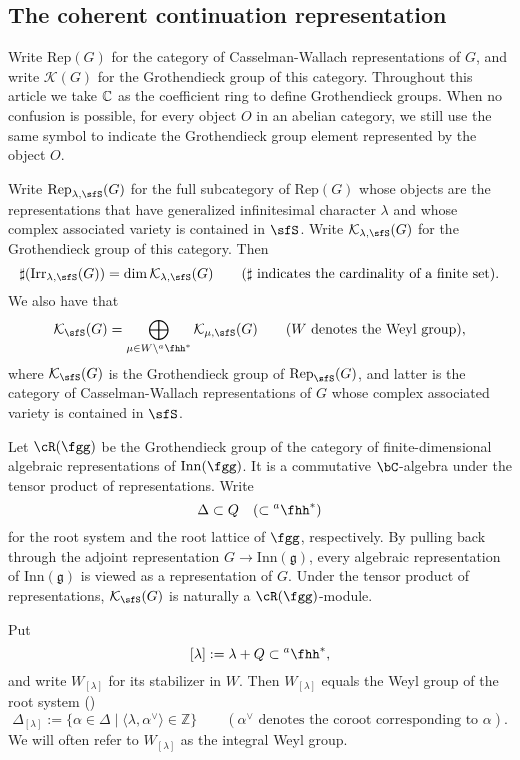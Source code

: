 \documentclass[12pt,a4paper]{amsart}
\newcommand{\CK}{{\mathcal {K}}}
\newcommand{\g}{\mathfrak g}
\newcommand{\Z}{\mathbb{Z}}
\numberwithin{equation}{section}
\theoremstyle{remark}
\def\Irr{\mathrm{Irr}}
\def\hha{{}^a\fhh}
\newcommand{\Lam}{{[\lambda]}}
\newcommand{\Rg}{\cR(\fgg)}
\begin{document}
\subsection{The coherent continuation representation}\label{sec11}


Write $\mathrm{Rep}(G)$ for the category of Casselman-Wallach representations of $G$, and write $\CK(G)$ for the
Grothendieck group of this category.  Throughout this article we take $\mathbb{C}$ as the coefficient ring to define  Grothendieck groups.
When no confusion is possible, for every object $O$ in an abelian category, we  still use the same symbol to indicate the Grothendieck group element represented by the object $O$.


Write $\mathrm{Rep}_{\lambda, \sfS}(G)$ for the full subcategory of $\mathrm{Rep}(G)$ whose objects are the representations that have
generalized infinitesimal character $\lambda$ and whose complex associated
variety is contained in $\sfS$. Write $\CK_{\lambda,\sfS}(G)$ for the
Grothendieck group of this category. Then
\[
  \sharp (\Irr_{\lambda,\sfS}(G))=\dim \CK_{\lambda,\sfS}(G)\qquad(\sharp\textrm{
    indicates the cardinality of a finite set}).
\]
We also have that
\[
  \CK_\sfS(G)=\bigoplus_{\mu\in W\backslash \hha^*} \CK_{\mu,\sfS}(G)\qquad (W\textrm{
    denotes the Weyl group}),
\]
where $\CK_{\sfS}(G)$ is the Grothendieck group of $\mathrm{Rep}_\sfS(G)$, and latter is the
category of Casselman-Wallach representations of $G$ whose complex associated
variety is contained in $\sfS$.


Let $\Rg$ be the Grothendieck group of the category of finite-dimensional algebraic
representations of $\mathrm{Inn}(\fgg)$. It is
 a commutative $\bC$-algebra under the tensor
product of representations.
Write \[
\Delta\subset Q \quad (\subset \hha^*)
\] for the root system and the root lattice of
$\fgg$, respectively.
By pulling back through the adjoint representation
$G\rightarrow \mathrm{Inn}(\g)$, every algebraic representation of $\mathrm{Inn}(\g)$ is viewed as a representation of $G$.
Under the tensor product of representations, $\CK_\sfS(G)$ is naturally a $\Rg$-module.


Put
\[
\Lam:=\lambda+Q\subset \hha^*,
\]
 and write $W_\Lam$
for its stabilizer in $W$. Then $W_\Lam$ equals the Weyl group of the root
system  (\cite[Section 1.3]{Jan})
\[
\Delta_\Lam:=  \{\alpha \in \Delta\mid \langle \lambda, \alpha^\vee\rangle \in \Z\}\qquad (\alpha^\vee \textrm{ denotes the coroot corresponding to $\alpha$}).
\]
We will often refer to $W_\Lam$ as the integral Weyl group.
\end{document}
